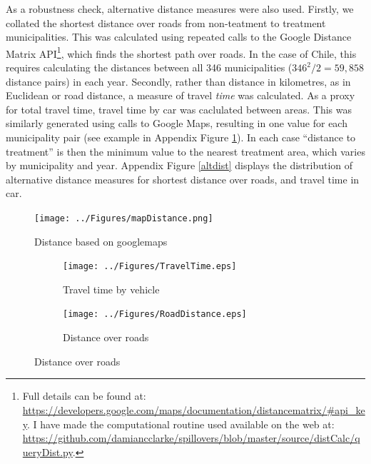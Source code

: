 \documentclass[11pt,subeqn]{article}
\begin{document}
\begin{spacing}{1.4}
As a robustness check, alternative distance measures were also used.
Firstly, we collated the shortest distance over roads from non-teatment to 
treatment municipalities.  This was calculated using repeated calls to the 
Google Distance Matrix API\footnote{Full details can be found at:
\url{https://developers.google.com/maps/documentation/distancematrix/\#api\_key}.
I have made the computational routine used available on the web at:
\url{https://github.com/damiancclarke/spillovers/blob/master/source/distCalc/queryDist.py}.}, 
which finds the shortest path over roads.  In the case of Chile, this requires 
calculating the distances between all 346 municipalities ($346^2/2=59,858$ 
distance pairs) in each year.  Secondly, rather than distance in 
kilometres, as in Euclidean or road distance, a measure of travel \emph{time} 
was calculated.  As a proxy for total travel time, travel time by car was 
caclulated between areas.  This was similarly generated using calls to Google 
Maps, resulting in one value for each municipality pair (see example in Appendix
Figure \ref{googdist}).  In each case ``distance to treatment'' is then the 
minimum value to the nearest treatment area, which varies by municipality and 
year.  Appendix Figure \ref{altdist} displays the distribution of alternative
distance measures for shortest distance over roads, and travel time in car.

\begin{figure}[htpb!]
\texttt{[image: ../Figures/mapDistance.png]}
\caption{Distance based on googlemaps}
\label{googdist}
\end{figure}

\begin{figure}[htpb!]
\begin{center}
\caption{Alternative Measures of Distance to Treatment}
\label{altdist}
\begin{subfigure}{.5\textwidth}
  \centering
  \texttt{[image: ../Figures/TravelTime.eps]}
  \caption{Travel time by vehicle}
  \label{travelTime}
\end{subfigure}%
\begin{subfigure}{.5\textwidth}
  \centering
  \texttt{[image: ../Figures/RoadDistance.eps]}
  \caption{Distance over roads}
  \label{roadDist}
\end{subfigure}
\end{center}
\vspace{-4mm}
\end{figure}


\end{spacing}
\end{document}
